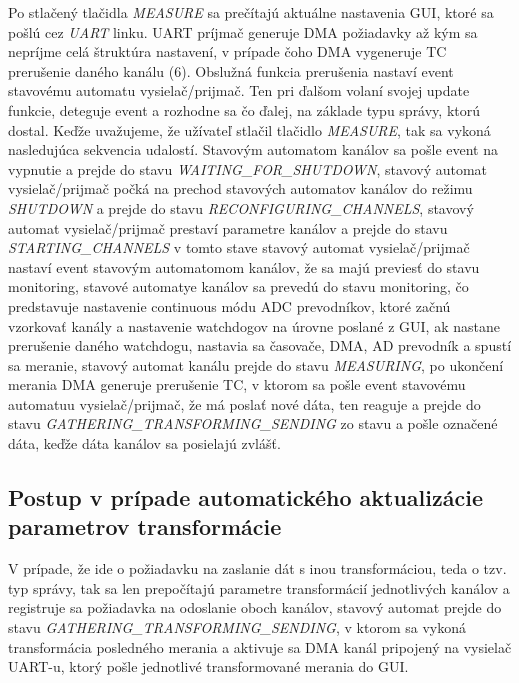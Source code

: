 \documentclass[main.tex]{subfiles}
\begin{document}
\begin{multicols*}{2}
			Po stlačený tlačidla \textit{MEASURE} sa prečítajú aktuálne nastavenia GUI, ktoré sa pošlú cez \textit{UART} linku. UART príjmač generuje DMA požiadavky až kým sa nepríjme celá štruktúra nastavení, v prípade čoho DMA vygeneruje TC prerušenie daného kanálu (6).  Obslužná funkcia prerušenia nastaví event stavovému automatu vysielač/prijmač. Ten pri ďalšom volaní svojej update funkcie, deteguje event a rozhodne sa čo ďalej, na základe typu správy, ktorú dostal. Keďže uvažujeme, že užívateľ stlačil tlačidlo \textit{MEASURE}, tak sa vykoná nasledujúca sekvencia udalostí. Stavovým automatom kanálov sa pošle event na vypnutie a prejde do stavu \textit{WAITING\_FOR\_SHUTDOWN}, stavový automat vysielač/prijmač počká na prechod stavových automatov kanálov do režimu \textit{SHUTDOWN} a prejde do stavu \textit{RECONFIGURING\_CHANNELS}, stavový automat vysielač/prijmač prestaví parametre kanálov a prejde do stavu \textit{STARTING\_CHANNELS} v tomto stave stavový automat vysielač/prijmač nastaví event stavovým automatomom kanálov, že sa majú previesť do stavu monitoring, stavové automatye kanálov sa prevedú do stavu monitoring, čo predstavuje nastavenie continuous módu ADC prevodníkov, ktoré začnú vzorkovať kanály a nastavenie watchdogov na úrovne poslané z GUI, ak nastane prerušenie daného watchdogu, nastavia sa časovače, DMA, AD prevodník a spustí sa meranie, stavový automat kanálu prejde do stavu \textit{MEASURING}, po ukončení merania DMA generuje prerušenie TC, v ktorom sa pošle event stavovému automatuu vysielač/prijmač, že má poslať nové dáta, ten reaguje a prejde do stavu \textit{GATHERING\_TRANSFORMING\_SENDING} zo stavu  a pošle označené dáta, keďže dáta kanálov sa posielajú zvlášť.
			
			\subsection{Postup v prípade automatického aktualizácie parametrov transformácie}
			 V prípade, že ide o požiadavku na zaslanie dát s inou transformáciou, teda o tzv.  typ správy, tak sa len prepočítajú parametre transformácií jednotlivých kanálov a registruje sa požiadavka na odoslanie oboch kanálov, stavový automat prejde do stavu \textit{GATHERING\_TRANSFORMING\_SENDING}, v ktorom sa vykoná transformácia posledného merania a aktivuje sa DMA kanál pripojený na vysielač UART-u, ktorý pošle jednotlivé transformované merania do GUI.
			 
			 
		\end{multicols*}
\end{document}
